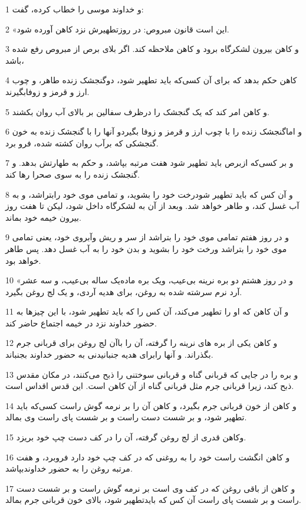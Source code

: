 \par 1 و خداوند موسی را خطاب کرده، گفت:
\par 2 «این است قانون مبروص: در روزتطهیرش نزد کاهن آورده شود.
\par 3 و کاهن بیرون لشکرگاه برود و کاهن ملاحظه کند. اگر بلای برص از مبروص رفع شده باشد،
\par 4 کاهن حکم بدهد که برای آن کسی‌که باید تطهیر شود، دوگنجشک زنده طاهر، و چوب ارز و قرمز و زوفابگیرند.
\par 5 و کاهن امر کند که یک گنجشک را درظرف سفالین بر بالای آب روان بکشند.
\par 6 و اماگنجشک زنده را با چوب ارز و قرمز و زوفا بگیردو آنها را با گنجشک زنده به خون گنجشکی که برآب روان کشته شده، فرو برد.
\par 7 و بر کسی‌که ازبرص باید تطهیر شود هفت مرتبه بپاشد، و حکم به طهارتش بدهد. و گنجشک زنده را به سوی صحرا رها کند.
\par 8 و آن کس که باید تطهیر شودرخت خود را بشوید، و تمامی موی خود رابتراشد، و به آب غسل کند، و طاهر خواهد شد. وبعد از آن به لشکرگاه داخل شود، لیکن تا هفت روز بیرون خیمه خود بماند.
\par 9 و در روز هفتم تمامی موی خود را بتراشد از سر و ریش وآبروی خود، یعنی تمامی موی خود را بتراشد ورخت خود را بشوید و بدن خود را به آب غسل دهد. پس طاهر خواهد بود.
\par 10 «و در روز هشتم دو بره نرینه بی‌عیب، ویک بره ماده‌یک ساله بی‌عیب، و سه عشر آرد نرم سرشته شده به روغن، برای هدیه آردی، و یک لج روغن بگیرد.
\par 11 و آن کاهن که او را تطهیر می‌کند، آن کس را که باید تطهیر شود، با این چیزها به حضور خداوند نزد در خیمه اجتماع حاضر کند.
\par 12 و کاهن یکی از بره های نرینه را گرفته، آن را باآن لج روغن برای قربانی جرم بگذراند. و آنها رابرای هدیه جنبانیدنی به حضور خداوند بجنباند.
\par 13 و بره را در جایی که قربانی گناه و قربانی سوختنی را ذبح می‌کنند، در مکان مقدس ذبح کند، زیرا قربانی جرم مثل قربانی گناه از آن کاهن است. این قدس اقداس است.
\par 14 و کاهن از خون قربانی جرم بگیرد، و کاهن آن را بر نرمه گوش راست کسی‌که باید تطهیر شود، و بر شست دست راست و بر شست پای راست وی بمالد.
\par 15 وکاهن قدری از لج روغن گرفته، آن را در کف دست چپ خود بریزد.
\par 16 و کاهن انگشت راست خود را به روغنی که در کف چپ خود دارد فروبرد، و هفت مرتبه روغن را به حضور خداوندبپاشد.
\par 17 و کاهن از باقی روغن که در کف وی است بر نرمه گوش راست و بر شست دست راست و بر شست پای راست آن کس که بایدتطهیر شود، بالای خون قربانی جرم بمالد.
